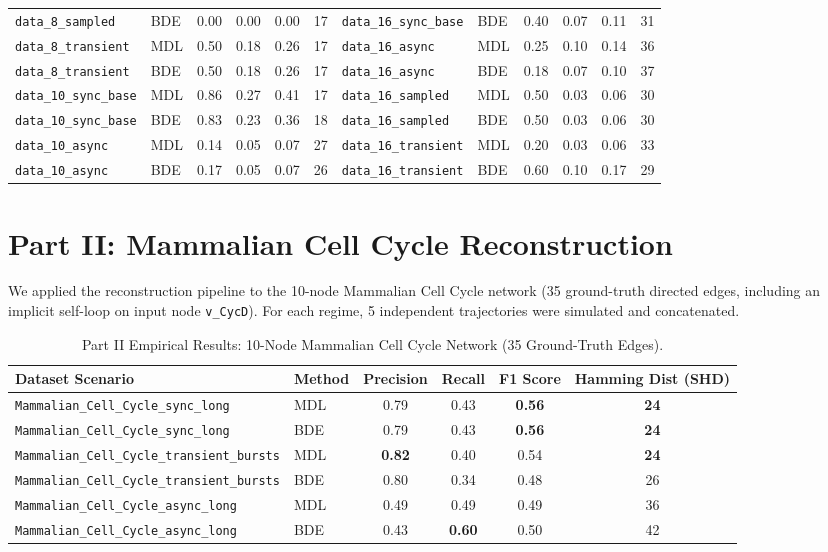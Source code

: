 \documentclass[11pt,a4paper]{article}
\begin{document}
\begin{table}[H]
\begin{tabular}{llcccc|llcccc}
\texttt{data\_8\_sampled}     & BDE & 0.00 & 0.00 & 0.00 & 17 & \texttt{data\_16\_sync\_base} & BDE & 0.40 & 0.07 & 0.11 & 31 \\
\texttt{data\_8\_transient}   & MDL & 0.50 & 0.18 & 0.26 & 17 & \texttt{data\_16\_async}      & MDL & 0.25 & 0.10 & 0.14 & 36 \\
\texttt{data\_8\_transient}   & BDE & 0.50 & 0.18 & 0.26 & 17 & \texttt{data\_16\_async}      & BDE & 0.18 & 0.07 & 0.10 & 37 \\
\texttt{data\_10\_sync\_base} & MDL & 0.86 & 0.27 & 0.41 & 17 & \texttt{data\_16\_sampled}    & MDL & 0.50 & 0.03 & 0.06 & 30 \\
\texttt{data\_10\_sync\_base} & BDE & 0.83 & 0.23 & 0.36 & 18 & \texttt{data\_16\_sampled}    & BDE & 0.50 & 0.03 & 0.06 & 30 \\
\texttt{data\_10\_async}      & MDL & 0.14 & 0.05 & 0.07 & 27 & \texttt{data\_16\_transient}  & MDL & 0.20 & 0.03 & 0.06 & 33 \\
\texttt{data\_10\_async}      & BDE & 0.17 & 0.05 & 0.07 & 26 & \texttt{data\_16\_transient}  & BDE & 0.60 & 0.10 & 0.17 & 29 \\
\bottomrule
\end{tabular}
\end{table}

\section{Part II: Mammalian Cell Cycle Reconstruction}

We applied the reconstruction pipeline to the 10-node Mammalian Cell Cycle network (35 ground-truth directed edges, including an implicit self-loop on input node \texttt{v\_CycD}). For each regime, 5 independent trajectories were simulated and concatenated.

\begin{table}[H]
\centering
\caption{Part II Empirical Results: 10-Node Mammalian Cell Cycle Network (35 Ground-Truth Edges).}
\label{tab:part2}
\begin{tabular}{llcccc}
\toprule
\textbf{Dataset Scenario} & \textbf{Method} & \textbf{Precision} & \textbf{Recall} & \textbf{F1 Score} & \textbf{Hamming Dist (SHD)} \\
\midrule
\texttt{Mammalian\_Cell\_Cycle\_sync\_long}        & MDL & 0.79 & 0.43 & \textbf{0.56} & \textbf{24} \\
\texttt{Mammalian\_Cell\_Cycle\_sync\_long}        & BDE & 0.79 & 0.43 & \textbf{0.56} & \textbf{24} \\
\texttt{Mammalian\_Cell\_Cycle\_transient\_bursts} & MDL & \textbf{0.82} & 0.40 & 0.54 & \textbf{24} \\
\texttt{Mammalian\_Cell\_Cycle\_transient\_bursts} & BDE & 0.80 & 0.34 & 0.48 & 26 \\
\texttt{Mammalian\_Cell\_Cycle\_async\_long}       & MDL & 0.49 & 0.49 & 0.49 & 36 \\
\texttt{Mammalian\_Cell\_Cycle\_async\_long}       & BDE & 0.43 & \textbf{0.60} & 0.50 & 42 \\
\bottomrule
\end{tabular}
\end{table}
\end{document}
